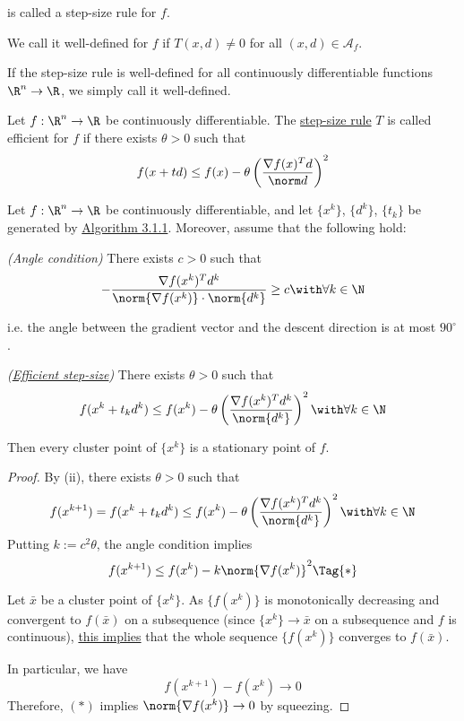 is called a step-size rule for $f$.

We call it well-defined for $f$ if $T(x,d)\neq0$ for all
$(x,d)\in\mathcal{A}_f$.

If the step-size rule is well-defined for all continuously differentiable
functions ${\R}^n\to{\R}$, we simply call it well-defined.

\label{d23fdf0}

Let $f:\R^n\to\R$ be continuously differentiable. The \href{ae4eac6}{step-size
rule} $T$ is called efficient for $f$ if there exists $\theta>0$ such that
$$
  f(x+td)\leq f(x)-\theta\left(\frac{\nabla f(x)^Td}{\norm d}\right)^2
$$

\label{aa19bbb}

Let $f:\R^n\to\R$ be continuously differentiable, and let $\{x^k\}$, $\{d^k\}$,
$\{t_k\}$ be generated by \href{edbf62c}{Algorithm 3.1.1}. Moreover, assume
that the following hold:
\begin{enumerati}
  \item \textit{(Angle condition)} There exists $c>0$ such that
  $$
    -\frac{\nabla f(x^k)^Td^k}{\norm{\nabla f(x^k)}\cdot\norm{d^k}}\geq c\with\forall k\in\N
  $$

  i.e. the angle between the gradient vector and the descent direction is at most
  $90^\circ$.
  \item \textit{(\href{d23fdf0}{Efficient step-size})} There exists
  $\theta>0$ such that
  $$
    f(x^k+t_kd^k)\leq f(x^k)-\theta\left(
    \frac{\nabla f(x^k)^Td^k}{\norm{d^k}}
    \right)^2\with\forall k\in\N
  $$
\end{enumerati}
Then every cluster point of $\{x^k\}$ is a stationary point of $f$.

\begin{proof}
  By (ii), there exists $\theta>0$ such that
  $$
    f(x^{k+1})=f(x^k+t_kd^k)\leq
    f(x^k)-\theta\left(
    \frac{\nabla f(x^k)^Td^k}{\norm{d^k}}
    \right)^2\with\forall k\in\N
  $$
  Putting $k:=c^2\theta$, the angle condition implies
  \begin{equation*}
    f(x^{k+1})\leq f(x^k)-k\norm{\nabla f(x^k)}^2\Tag{*}
  \end{equation*}

  Let $\bar x$ be a cluster point of $\{x^k\}$. As $\{f(x^k)\}$ is monotonically
  decreasing and convergent to $f(\bar x)$ on a subsequence (since
  $\{x^k\}\to\bar x$ on a subsequence and $f$ is continuous), \href{aaf3ba6}{this
  implies} that the whole sequence $\{f(x^k)\}$ converges to $f(\bar x)$.

  In particular, we have
  $$
    f(x^{k+1})-f(x^k)\to0
  $$
  Therefore, $(*)$ implies $\norm{\nabla f(x^k)}\to0$ by squeezing.
\end{proof}

